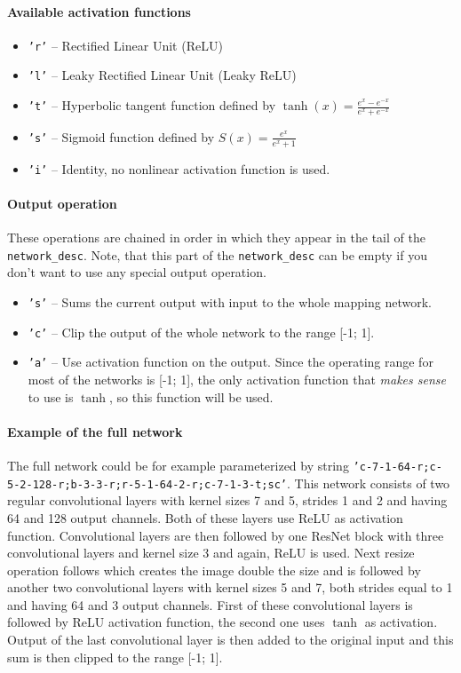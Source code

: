 \paragraph{Available activation functions}
\begin{itemize}
\item \texttt{'r'} -- Rectified Linear Unit (ReLU)~\cite{relu}
\item \texttt{'l'} -- Leaky Rectified Linear Unit (Leaky ReLU)~\cite{leakyrelu}
\item \texttt{'t'} -- Hyperbolic tangent function defined by $\tanh(x) = \frac{e^x - e^{-x}}{e^x + e^{-x}}$
\item \texttt{'s'} -- Sigmoid function defined by $S(x) = \frac{e^x}{e^x + 1}$
\item \texttt{'i'} -- Identity, no nonlinear activation function is used.
\end{itemize}

\paragraph{Output operation}
These operations are chained in order in which they appear in the tail of the \texttt{network\_desc}. Note, that this part of the \texttt{network\_desc} can be empty if you don't want to use any special output operation.
\begin{itemize}
\item \texttt{'s'} -- Sums the current output with input to the whole mapping network.
\item \texttt{'c'} -- Clip the output of the whole network to the range [-1; 1].
\item \texttt{'a'} -- Use activation function on the output. Since the operating range for most of the networks is [-1; 1], the only activation function that {\em makes sense} to use is $\tanh$, so this function will be used.
\end{itemize}

\paragraph{Example of the full network}
The full network could be for example parameterized by string \texttt{'c-7-1-64-r;c-5-2-128-r;b-3-3-r;r-5-1-64-2-r;c-7-1-3-t;sc'}. This network consists of two regular convolutional layers with kernel sizes 7 and 5, strides 1 and 2 and having 64 and 128 output channels. Both of these layers use ReLU as activation function. Convolutional layers are then followed by one ResNet block with three convolutional layers and kernel size 3 and again, ReLU is used. Next resize operation follows which creates the image double the size and is followed by another two convolutional layers with kernel sizes 5 and 7, both strides equal to 1 and having 64 and 3 output channels. First of these convolutional layers is followed by ReLU activation function, the second one uses $\tanh$ as activation. Output of the last convolutional layer is then added to the original input and this sum is then clipped to the range [-1; 1].

